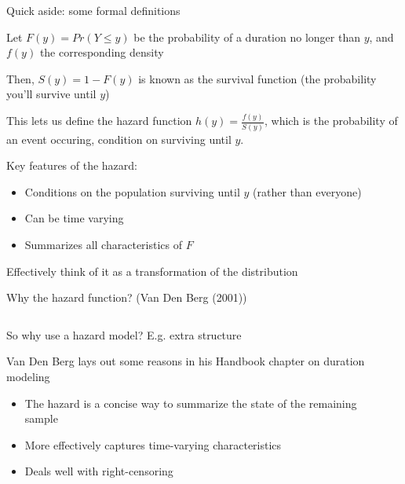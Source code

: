 \documentclass[notes,11pt, aspectratio=169]{beamer}
\newenvironment{wideitemize}{\itemize\addtolength{\itemsep}{10pt}}{\enditemize}
\begin{document}
\begin{frame}{Quick aside: some formal definitions}
  \begin{wideitemize}
  \item Let $F(y) = Pr(Y \leq y)$ be the probability of a duration no longer than $y$, and $f(y)$ the corresponding density
  \item Then, $S(y) = 1-F(y)$ is known as the survival function (the
    probability you'll survive until $y$)
  \item This lets us define the hazard function
    $h(y) = \frac{f(y)}{S(y)}$, which is the probability of an event
    occuring, condition on surviving until $y$.
  \item Key features of the hazard:
    \begin{itemize}
    \item Conditions on the population surviving until $y$ (rather
      than everyone)
    \item Can be time varying
    \item Summarizes all characteristics of $F$
    \end{itemize}
  \item Effectively think of it as a transformation of the distribution 
  \end{wideitemize}
\end{frame}


\begin{frame}{Why the hazard function? (Van Den Berg (2001))}
    \begin{columns}[T] %
    \begin{column}{.4\textwidth}
      \begin{wideitemize}
      \item<1-> So why use a hazard model? E.g. extra structure
      \item<1-> Van Den Berg lays out some reasons in his Handbook chapter
        on duration modeling
        \begin{itemize}
        \item<1-> The hazard is a concise way to summarize the state
          of the remaining sample
        \item<2-> More effectively captures time-varying characteristics
        \item<2-> Deals well with right-censoring
        \end{itemize}
        \end{wideitemize}
    \end{column}%
  \hfill%
  \begin{column}{.6\textwidth}
    \begin{center}
    \end{center}
  \end{column}
\end{columns}
\end{frame}
\end{document}
